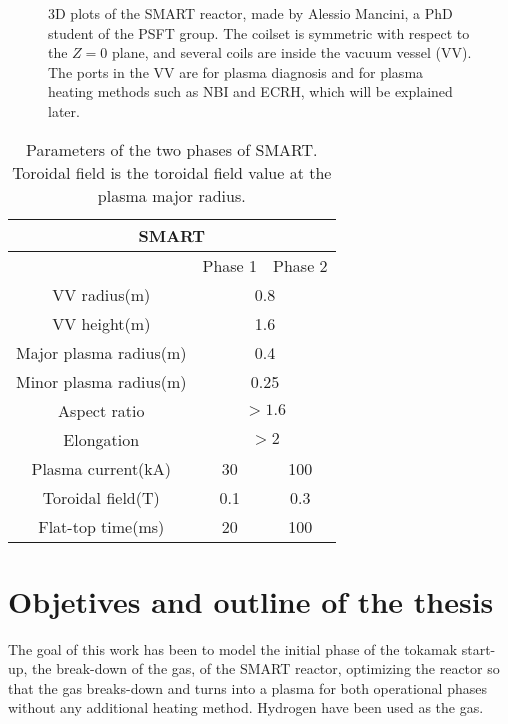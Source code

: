 \documentclass[a4paper,12pt,oneside]{book}
\begin{document}
\begin{figure}[htbp]
\centering
{}
\hfill
{}
\caption{3D plots of the SMART reactor, made by Alessio Mancini, a PhD student of the PSFT group. The coilset is symmetric with respect to the $Z=0$ plane, and several coils are inside the vacuum vessel (VV). The ports in the VV are for plasma diagnosis and for plasma heating methods such as NBI and ECRH, which will be explained later.}
\label{fig_SMART_3D_Alessio}
\end{figure}

\begin{table}[h!]
\centering
	\begin{tabular}{|c|c|c|} \hline
		\multicolumn{3}{|c|}{SMART}\\ \hline
		& Phase 1 & Phase 2 \\ \hline
		VV radius(m) & \multicolumn{2}{|c|}{0.8} \\ \hline
		VV height(m) & \multicolumn{2}{|c|}{1.6} \\ \hline
		Major plasma radius(m) & \multicolumn{2}{|c|}{0.4} \\ \hline
		Minor plasma radius(m) & \multicolumn{2}{|c|}{0.25} \\ \hline
		Aspect ratio & \multicolumn{2}{|c|}{$>1.6$} \\ \hline	
		Elongation & \multicolumn{2}{|c|}{$>2$} \\ \hline
		Plasma current(kA) & 30 & 100  \\ \hline
		Toroidal field(T) & 0.1 & 0.3  \\ \hline
		Flat-top time(ms) & 20 & 100 \\ \hline
	\end{tabular}
	\caption{Parameters of the two phases of SMART. Toroidal field is the toroidal field value at the plasma major radius.}
	\label{table_SMART_parameters}
\end{table}
%

\section{Objetives and outline of the thesis}

The goal of this work has been to model the initial phase of the tokamak start-up, the break-down of the gas, of the SMART reactor, optimizing the reactor so that the gas breaks-down and turns into a plasma for both operational phases without any additional heating method. Hydrogen have been used as the gas.
\end{document}
